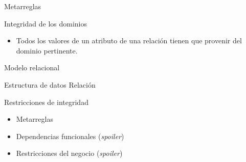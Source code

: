 \begin{frame}{}
\begin{tikzpicture}
    \end{tikzpicture}
    \vspace{3mm}



\end{frame}


\begin{frame}{Metarreglas}
  

    \begin{block}{Integridad de los dominios}
        \begin{itemize}
            \item Todos los valores de un atributo de una
            relaci\'on tienen que provenir del dominio pertinente.
        \end{itemize}
        
    \end{block}
    \vspace{3mm}

    \centering


\end{frame}



\begin{frame}{Modelo relacional}
    \vspace{5mm}
    \begin{overlayarea}{\linewidth}{\textheight}
        \begin{block}{Estructura de datos}
           Relaci\'on
        \end{block}

        \begin{block}{Restricciones de integridad}
            \begin{itemize}
                \item Metarreglas
                \item Dependencias funcionales (\textit{spoiler})
                \item Restricciones del negocio (\textit{spoiler})
            \end{itemize}
            
        \end{block}
    \end{overlayarea}

\end{frame}

